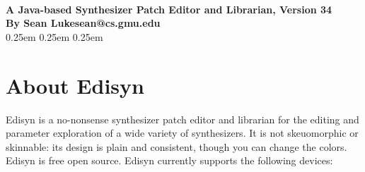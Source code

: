 \documentclass{article}
\begin{document}
\\[0.5em]
{\large \bf A Java-based Synthesizer Patch Editor and Librarian, Version 34\\[0.2em]
By Sean Luke\qquad sean@cs.gmu.edu}\\[0.2em]

\vspace{-1em}
\setcounter{tocdepth}{2}
\advance\cftsecnumwidth 0.25em\relax
\advance\cftsubsecindent 0.25em\relax
\advance\cftsubsecnumwidth 0.25em\relax
\tableofcontents

\clearpage

\section{About Edisyn}

Edisyn is a no-nonsense synthesizer patch editor and librarian for the editing and parameter exploration of a wide variety of synthesizers.  It is not skeuomorphic or skinnable: its design is plain and consistent, though you can change the colors.  Edisyn is free open source.  Edisyn currently supports the following devices: 
\end{document}
